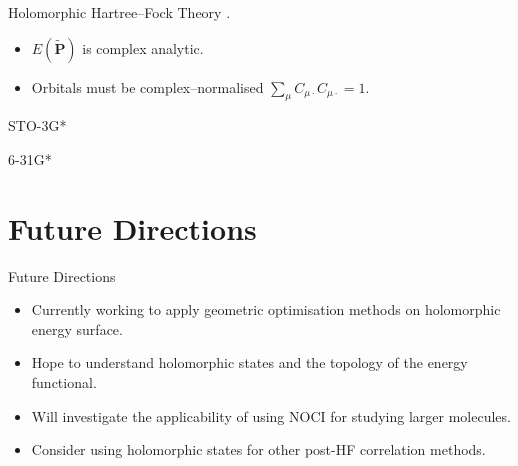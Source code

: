 \documentclass{beamer}
\begin{document}
\begin{frame}{Holomorphic Hartree--Fock Theory}
 .
 \begin{itemize}
  \item<2-> $E\left(\mathbf{\tilde P}\right)$ is complex analytic.
  \item<3-> Orbitals must be complex--normalised $\sum_{\mu} C_{\mu \cdot} C_{\mu \cdot} = 1.$
 \end{itemize}
 \vfill
 \vspace{2em}
\end{frame}

\begin{frame}{ STO-3G*}
 \vspace{-1em}
 \begin{center}

 \end{center}
\end{frame} 

\begin{frame}{ 6-31G*}
 \vspace{-1em}
 \begin{center}

 \end{center}
\end{frame} 

\section{Future Directions}
\begin{frame}{Future Directions}
 \begin{itemize}
  \item<1->{Currently working to apply geometric optimisation methods on holomorphic energy surface.}
  \item<2->{Hope to understand holomorphic states and the topology of the energy functional.}
  \item<3->{Will investigate the applicability of using NOCI for studying larger molecules.}
  \item<4->{Consider using holomorphic states for other post-HF correlation methods.}
 \end{itemize}
\end{frame}
\end{document}
